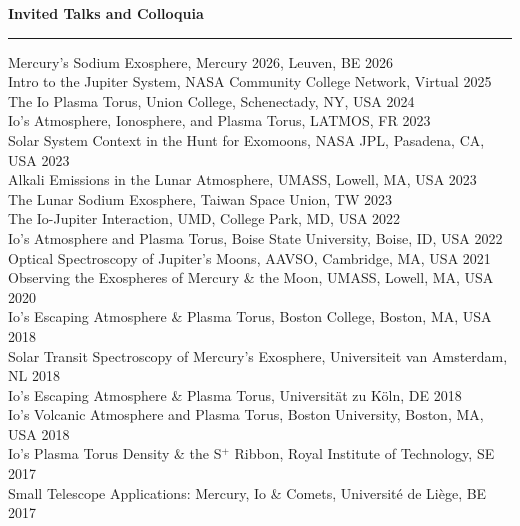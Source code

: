 \documentclass[12pt]{report}
\begin{document}
\vspace{2 mm}
\noindent\bf{Invited Talks and Colloquia}\rm \hspace*{\fill} \\
\rule{\textwidth}{1pt}
\noindent Mercury's Sodium Exosphere, Mercury 2026, Leuven, BE \hfill 2026\\
\noindent Intro to the Jupiter System, NASA Community College Network, Virtual \hfill 2025\\
\noindent The Io Plasma Torus, Union College, Schenectady, NY, USA \hfill 2024\\
\noindent Io's Atmosphere, Ionosphere, and Plasma Torus, LATMOS, FR \hfill 2023\\
\noindent Solar System Context in the Hunt for Exomoons, NASA JPL, Pasadena, CA, USA \hfill 2023\\
\noindent Alkali Emissions in the Lunar Atmosphere, UMASS, Lowell, MA, USA \hfill 2023\\
\noindent The Lunar Sodium Exosphere, Taiwan Space Union, TW \hfill 2023\\
\noindent The Io-Jupiter Interaction, UMD, College Park, MD, USA \hfill 2022\\
\noindent Io's Atmosphere and Plasma Torus, Boise State University, Boise, ID, USA \hfill 2022\\
\noindent Optical Spectroscopy of Jupiter's Moons, AAVSO, Cambridge, MA, USA \hfill 2021\\
\noindent Observing the Exospheres of Mercury \& the Moon, UMASS, Lowell, MA, USA \hfill 2020\\
\noindent Io's Escaping Atmosphere \& Plasma Torus, Boston College, Boston, MA, USA \hfill 2018\\
\noindent Solar Transit Spectroscopy of Mercury's Exosphere, Universiteit van Amsterdam, NL \hfill 2018\\
\noindent Io's Escaping Atmosphere \& Plasma Torus, Universit\"at zu K\"oln, DE \hfill 2018\\
\noindent Io's Volcanic Atmosphere and Plasma Torus, Boston University, Boston, MA, USA \hfill 2018\\
\noindent Io's Plasma Torus Density \& the S$^+$ Ribbon, Royal Institute of Technology, SE \hfill 2017\\
\noindent Small Telescope Applications: Mercury, Io \& Comets, Universit\'e de Li\`ege, BE \hfill 2017\\
\end{document}
